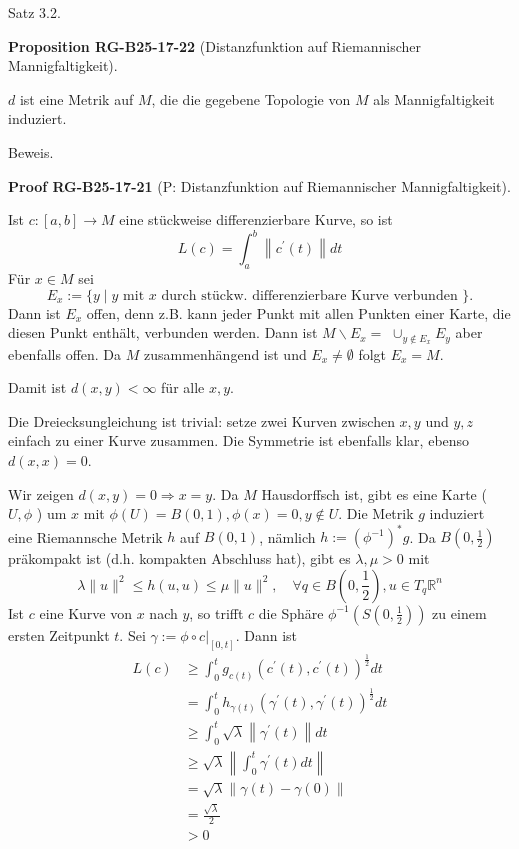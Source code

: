 \documentclass[10pt, letterpaper]{article}
\newcommand{\CustomHeading}[3]{%
  \par\medskip\noindent%
  \textbf{#1 #2} \textnormal{(#3)}.\enskip%
}
\newenvironment{PROP}[2]{\begin{unitbox}\CustomHeading{Proposition}{#1}{#2}}{\end{unitbox}}
\newenvironment{PROOF}[2]{\begin{unitbox}\CustomHeading{Proof}{#1}{#2}}{\end{unitbox}}
\begin{document}
Satz 3.2. 


\begin{PROP}{RG-B25-17-22}{Distanzfunktion auf Riemannischer Mannigfaltigkeit}
$d$ ist eine Metrik auf $M$, die die gegebene Topologie von $M$ als Mannigfaltigkeit induziert.
\end{PROP}



Beweis. 


\begin{PROOF}{RG-B25-17-21}{P: Distanzfunktion auf Riemannischer Mannigfaltigkeit}
Ist $c:[a, b] \rightarrow M$ eine stückweise differenzierbare Kurve, so ist
$$
L(c)=\int_{a}^{b}\left\|c^{\prime}(t)\right\| d t
$$
Für $x \in M$ sei
$$
E_{x}:=\{y \mid y \text { mit } x \text { durch stückw. differenzierbare Kurve verbunden }\} .
$$
Dann ist $E_{x}$ offen, denn z.B. kann jeder Punkt mit allen Punkten einer Karte, die diesen Punkt enthält, verbunden werden. Dann ist $M \backslash E_{x}=$ $\cup_{y \notin E_{x}} E_{y}$ aber ebenfalls offen. Da $M$ zusammenhängend ist und $E_{x} \neq \emptyset$ folgt $E_{x}=M$.

Damit ist $d(x, y)<\infty$ für alle $x, y$.

Die Dreiecksungleichung ist trivial: setze zwei Kurven zwischen $x, y$ und $y, z$ einfach zu einer Kurve zusammen. Die Symmetrie ist ebenfalls klar, ebenso $d(x, x)=0$.

Wir zeigen $d(x, y)=0 \Longrightarrow x=y$. Da $M$ Hausdorffsch ist, gibt es eine Karte ( $U, \phi$ ) um $x$ mit $\phi(U)=B(0,1), \phi(x)=0, y \notin U$. Die Metrik $g$ induziert eine Riemannsche Metrik $h$ auf $B(0,1)$, nämlich $h:=\left(\phi^{-1}\right)^{*} g$. Da $B\left(0, \frac{1}{2}\right)$ präkompakt ist (d.h. kompakten Abschluss hat), gibt es $\lambda, \mu>0$ mit
$$
\lambda\|u\|^{2} \leq h(u, u) \leq \mu\|u\|^{2}, \quad \forall q \in B\left(0, \frac{1}{2}\right), u \in T_{q} \mathbb{R}^{n}
$$
Ist $c$ eine Kurve von $x$ nach $y$, so trifft $c$ die Sphäre $\phi^{-1}\left(S\left(0, \frac{1}{2}\right)\right)$ zu einem ersten Zeitpunkt $t$. Sei $\gamma:=\left.\phi \circ c\right|_{[0, t]}$. Dann ist
$$
\begin{aligned}
L(c) & \geq \int_{0}^{t} g_{c(t)}\left(c^{\prime}(t), c^{\prime}(t)\right)^{\frac{1}{2}} d t \\
& =\int_{0}^{t} h_{\gamma(t)}\left(\gamma^{\prime}(t), \gamma^{\prime}(t)\right)^{\frac{1}{2}} d t \\
& \geq \int_{0}^{t} \sqrt{\lambda}\left\|\gamma^{\prime}(t)\right\| d t \\
& \geq \sqrt{\lambda}\left\|\int_{0}^{t} \gamma^{\prime}(t) d t\right\| \\
& =\sqrt{\lambda}\|\gamma(t)-\gamma(0)\| \\
& =\frac{\sqrt{\lambda}}{2} \\
& >0
\end{aligned}
$$


\end{PROOF}
\end{document}
